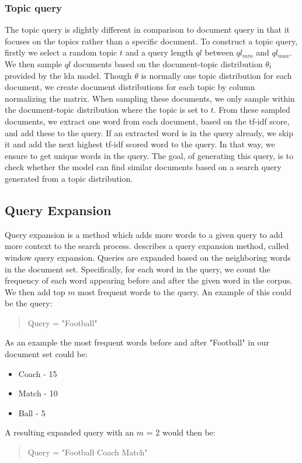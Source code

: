 \subsubsection{Topic query}\label{subsec:query_gen_top}
The topic query is slightly different in comparison to document query in that it focuses on the topics rather than a specific document.
To construct a topic query, firstly we select a random topic $t$ and a query length $ql$ between $ql_{min}$ and $ql_{max}$.
We then sample $ql$ documents based on the document-topic distribution $\theta_t$ provided by the \gls{lda} model.
Though $\theta$ is normally one topic distribution for each document, we create document distributions for each topic by column normalizing the matrix.
When sampling these documents, we only sample within the document-topic distribution where the topic is set to $t$.
From these sampled documents, we extract one word from each document, based on the \gls{tf-idf} score, and add these to the query.
If an extracted word is in the query already, we skip it and add the next highest \gls{tf-idf} scored word to the query.
In that way, we ensure to get unique words in the query.
The goal, of generating this query, is to check whether the model can find similar documents based on a search query generated from a topic distribution.

\subsection{Query Expansion}\label{subsec:query_expansion}
Query expansion is a method which adds more words to a given query to add more context to the search process.
\citet{yang2009topic} describes a query expansion method, called window query expansion.
Queries are expanded based on the neighboring words in the document set.
Specifically, for each word in the query, we count the frequency of each word appearing before and after the given word in the corpus.
We then add top $m$ most frequent words to the query.
An example of this could be the query: 
\begin{quote}
	Query = "Football"
\end{quote}
As an example the most frequent words before and after "Football" in our document set could be:
\begin{itemize}
	\item Coach - 15
	\item Match - 10
	\item Ball - 5
\end{itemize}
A resulting expanded query with an $m$ = 2 would then be:
\begin{quote}
	Query = "Football Coach Match"
\end{quote}



